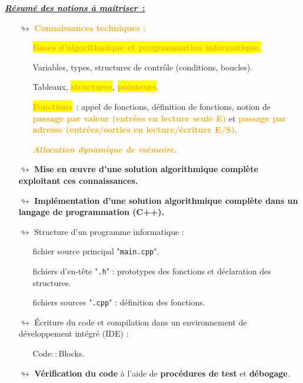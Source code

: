 \documentclass[10pt, fleqn, a4paper]{article}
\newcommand{\bfcolor}[2]{\textcolor{#1}{\textbf{#2}}}
\begin{document}
{\begin{minipage}[l]{\textwidth}
\vspace{2mm}
{\bf \underline{\textit{Résumé des notions à maîtriser}~:}}
\begin{itemize}
\item[$\looparrowright$] \bfcolor{orange}{Connaissances techniques :}
\begin{itemize}
\item[\ding{223}] \colorbox{yellow}{\bfcolor{orange}{Bases d'algorithmique et programmation informatique.}}
\item[\ding{223}] Variables, types, structures de contrôle (conditions, boucles).
\item[\ding{223}] Tableaux, \colorbox{yellow}{\bfcolor{orange}{structures}}, \colorbox{yellow}{\bfcolor{orange}{pointeurs}}.
\item[\ding{223}] \colorbox{yellow}{\bfcolor{orange}{Fonctions}}~: appel de fonctions, définition de fonctions, notion de \bfcolor{orange}{passage par valeur (entrées en \og{}lecture seule\fg{} E)} et \bfcolor{orange}{passage par adresse (entrées/sorties en \og{}lecture/écriture\fg{} E/S)}.
\item[\ding{223}] \bfcolor{orange}{\textit{Allocation dynamique de mémoire.}}
\end{itemize}
\item[$\looparrowright$] \bfcolor{redC1}{Mise en œuvre d'une solution algorithmique complète exploitant ces connaissances.}
\item[$\looparrowright$] \bfcolor{redC1}{Implémentation d'une solution algorithmique complète dans un langage de programmation (C++).}
\item[$\looparrowright$] Structure d’un programme informatique :
\begin{itemize}
\item[\ding{223}] fichier source principal "\texttt{main.cpp}".
\item[\ding{223}] fichiers d'en-tête "\texttt{.h}" : prototypes des fonctions et déclaration des structures.
\item[\ding{223}] fichiers sources "\texttt{.cpp}" : définition des fonctions.
\end{itemize}
\item[$\looparrowright$] Écriture du code et compilation dans un environnement de développement intégré (IDE) :
\begin{itemize}
\item[\ding{223}] Code$::$Blocks.
\end{itemize}
\item[$\looparrowright$] \bfcolor{greenC2}{Vérification du code} à l'aide de \bfcolor{greenC2}{procédures de test} et \bfcolor{greenC2}{débogage}.
\end{itemize}
\end{minipage}}
\end{document}
